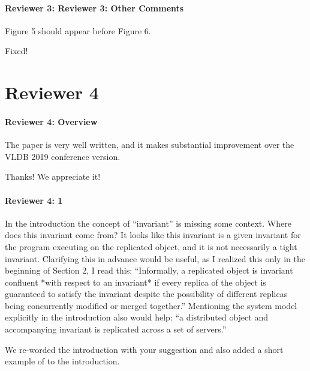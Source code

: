 \documentclass[9pt]{article}
\begin{document}
\begin{multicols*}{2}
\paragraph{Reviewer 3: Reviewer 3: Other Comments}
\begin{feedback}
  Figure 5 should appear before Figure 6.
\end{feedback}
Fixed!

\section*{Reviewer 4}
\paragraph{Reviewer 4: Overview}
\begin{feedback}
  The paper is very well written, and it makes substantial improvement over the
  VLDB 2019 conference version.
\end{feedback}
Thanks! We appreciate it!

\paragraph{Reviewer 4: 1}
\begin{feedback}
  In the introduction the concept of ``invariant'' is missing some context. Where
  does this invariant come from? It looks like this invariant is a given
  invariant for the program executing on the replicated object, and it is not
  necessarily a tight invariant.  Clarifying this in advance would be useful,
  as I realized this only in the beginning of Section 2, I read this:
  ``Informally, a replicated object is invariant confluent *with respect to an
  invariant* if every replica of the object is guaranteed to satisfy the
  invariant despite the possibility of different replicas being concurrently
  modified or merged together.'' Mentioning the system model explicitly in the
  introduction also would help: ``a distributed object and accompanying
  invariant is replicated across a set of servers.''
\end{feedback}
We re-worded the introduction with your suggestion and also added a short
example of \invariantconfluence{} to the introduction.


\end{multicols*}
\end{document}
